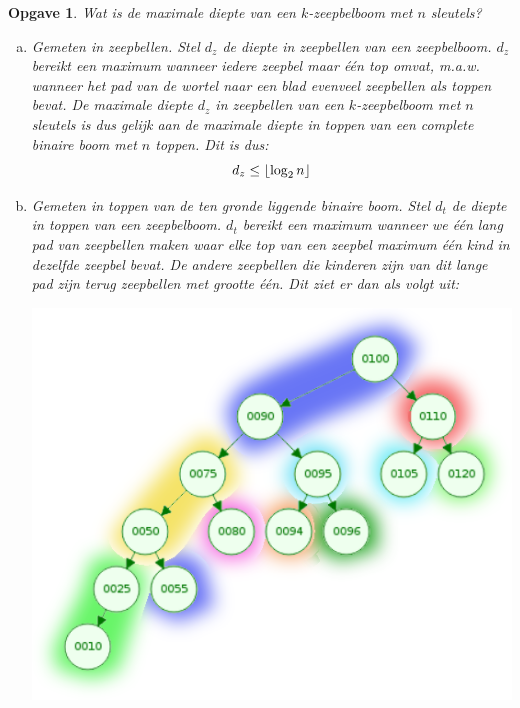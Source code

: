 \documentclass[12pt]{article}
\DeclarePairedDelimiter\floor{\lfloor}{\rfloor}
\newtheorem{opgave}{Opgave}
\begin{document}
    \begin{opgave}
        Wat is de maximale diepte van een $k$-zeepbelboom met $n$ sleutels?
        \begin{enumerate}[a.]
            \item Gemeten in zeepbellen. 
                \newline 
                \newline
                \begingroup 
                \normalfont
                Stel $d_z$ de diepte in zeepbellen van een zeepbelboom. $d_z$ bereikt een maximum wanneer iedere zeepbel maar één top omvat,
                m.a.w. wanneer het pad van de wortel naar een blad evenveel zeepbellen als toppen bevat. 
                De maximale diepte $d_z$ in zeepbellen van een $k$-zeepbelboom met $n$ sleutels is dus gelijk aan de maximale diepte in toppen van een complete binaire boom met $n$ toppen. Dit is dus:
                $$d_z \le \floor{\log_2 n}$$
            \endgroup
        \item Gemeten in toppen van de ten gronde liggende binaire boom.
            \newline 
            \newline
            \begingroup
            \normalfont
        Stel $d_t$ de diepte in toppen van een zeepbelboom. $d_t$ bereikt een maximum wanneer we één lang pad van zeepbellen maken waar elke top van een zeepbel maximum één kind in dezelfde zeepbel bevat. De andere zeepbellen die kinderen zijn van dit lange pad zijn terug zeepbellen met grootte één. Dit ziet er dan als volgt uit:\newline
            \begin{center}
                \includegraphics[scale=0.75]{Tree.png}

\end{center}
\end{enumerate}
\end{opgave}
\end{document}
